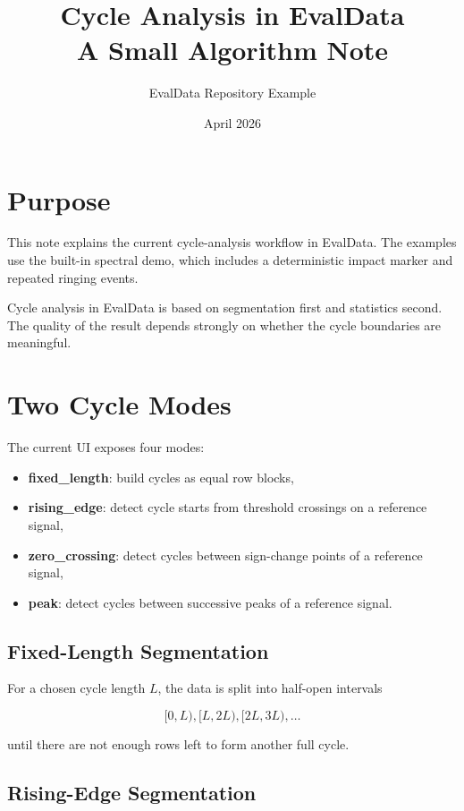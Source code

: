 \documentclass[11pt,a4paper]{article}
\title{Cycle Analysis in EvalData\\A Small Algorithm Note}
\author{EvalData Repository Example}
\date{April 2026}
\begin{document}
\maketitle

\section{Purpose}

This note explains the current cycle-analysis workflow in EvalData. The examples use the built-in spectral demo, which includes a deterministic impact marker and repeated ringing events.

Cycle analysis in EvalData is based on segmentation first and statistics second. The quality of the result depends strongly on whether the cycle boundaries are meaningful.

\section{Two Cycle Modes}

The current UI exposes four modes:

\begin{itemize}
    \item \textbf{fixed\_length}: build cycles as equal row blocks,
    \item \textbf{rising\_edge}: detect cycle starts from threshold crossings on a reference signal,
    \item \textbf{zero\_crossing}: detect cycles between sign-change points of a reference signal,
    \item \textbf{peak}: detect cycles between successive peaks of a reference signal.
\end{itemize}

\subsection{Fixed-Length Segmentation}

For a chosen cycle length $L$, the data is split into half-open intervals

\[
[0,L), [L,2L), [2L,3L), \dots
\]

until there are not enough rows left to form another full cycle.

\subsection{Rising-Edge Segmentation}
\end{document}
